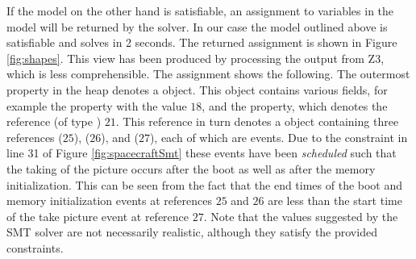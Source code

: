 If the model on the other hand is satisfiable, an assignment to
variables in the model will be returned by the solver. In our case the
model outlined above is satisfiable and solves in 2 seconds. 
The returned assignment is shown
in Figure \ref{fig:shapes}. This view has been produced by processing
the output from Z3, which is less comprehensible.
%
The assignment shows the following. The outermost 
property in the heap denotes a  object.  This object
contains various fields, for example the  property with
the value $18$, and the  property, which denotes the
reference (of type ) $21$. This reference in turn denotes a
 object containing three references 
($25$),  ($26$), and  ($27$), each of
which are events. Due to the constraint in line 31 of Figure
\ref{fig:spacecraftSmt} these events have been {\em scheduled} such
that the taking of the picture occurs after the boot as well as after
the memory initialization.  This can be seen from the fact that the
end times of the boot and memory initialization events at references
$25$ and $26$ are less than the start time of the take picture event
at reference $27$. Note that the values suggested by the SMT solver 
are not necessarily realistic, although they satisfy the provided
constraints.

\lstset{language=K}

